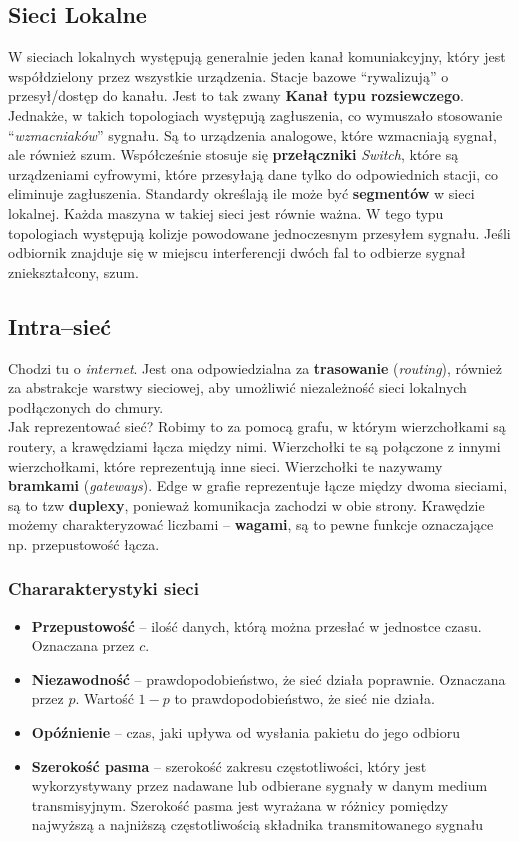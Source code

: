 \documentclass[11pt,a4paper]{article}
\begin{document}
\subsection{Sieci Lokalne}
W sieciach lokalnych występują generalnie jeden kanał komuniakcyjny, który jest współdzielony przez wszystkie urządzenia. Stacje bazowe ``rywalizują'' o przesył/dostęp do kanału. Jest to tak zwany \textbf{Kanał typu rozsiewczego}. Jednakże, w takich topologiach występują zagłuszenia, co wymuszało stosowanie ``\textit{wzmacniaków}'' sygnału. Są to urządzenia analogowe, które wzmacniają sygnał, ale również szum. Współcześnie stosuje się \textbf{przełączniki} \textit{Switch}, które są urządzeniami cyfrowymi, które przesyłają dane tylko do odpowiednich stacji, co eliminuje zagłuszenia. Standardy określają ile może być \textbf{segmentów} w sieci lokalnej. Każda maszyna w takiej sieci jest równie ważna.
W tego typu topologiach występują kolizje powodowane jednoczesnym przesyłem sygnału. Jeśli odbiornik znajduje się w miejscu interferencji dwóch fal to odbierze sygnał zniekształcony, szum.
\subsection{Intra--sieć}
Chodzi tu o \textit{internet}. Jest ona odpowiedzialna za \textbf{trasowanie} (\textit{routing}), również za abstrakcje warstwy sieciowej, aby umożliwić niezależność sieci lokalnych podłączonych do chmury.\\
Jak reprezentować sieć? Robimy to za pomocą grafu, w którym wierzchołkami są routery, a krawędziami łącza między nimi. Wierzchołki te są połączone z innymi wierzchołkami, które reprezentują inne sieci. Wierzchołki te nazywamy \textbf{bramkami} (\textit{gateways}). Edge w grafie reprezentuje łącze między dwoma sieciami, są to tzw \textbf{duplexy}, ponieważ komunikacja zachodzi w obie strony. Krawędzie możemy charakteryzować liczbami -- \textbf{wagami}, są to pewne funkcje oznaczające np. przepustowość łącza.
\subsubsection{Chararakterystyki sieci}
\begin{itemize}
    \item \textbf{Przepustowość} -- ilość danych, którą można przesłać w jednostce czasu. Oznaczana przez $c$.
    \item \textbf{Niezawodność} -- prawdopodobieństwo, że sieć działa poprawnie. Oznaczana przez $p$. Wartość $1-p$ to prawdopodobieństwo, że sieć nie działa.
    \item \textbf{Opóźnienie} -- czas, jaki upływa od wysłania pakietu do jego odbioru
    \item \textbf{Szerokość pasma} -- szerokość zakresu częstotliwości, który jest wykorzystywany przez nadawane lub odbierane sygnały w danym medium transmisyjnym. Szerokość pasma jest wyrażana w różnicy pomiędzy najwyższą a najniższą częstotliwością składnika transmitowanego sygnału
\end{itemize}
\end{document}

